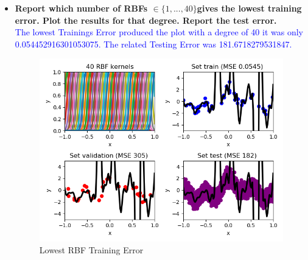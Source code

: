 \documentclass[a4paper]{article}
\begin{document}
\begin{itemize}
\item \textbf{Report which number of RBFs $∈ \{1, . . . , 40\} $gives the lowest training error. Plot the results for that degree. Report the test error.}\\
\textcolor{blue}{The lowest Trainings Error produced the plot with a degree of 40 it was only  0.054452916301053075. The related Testing Error was 181.6718279531847.}
\begin{figure}[ht]
    \centering
  \includegraphics[scale=0.50]{plots/plot_rbf_degree40.png}
 \captionsetup{justification=centering}
  \caption{Lowest RBF Training Error}
\label{plot_rbf_degree13_lowest_validation_error}
  \end{figure}
  

\end{itemize}
\end{document}
